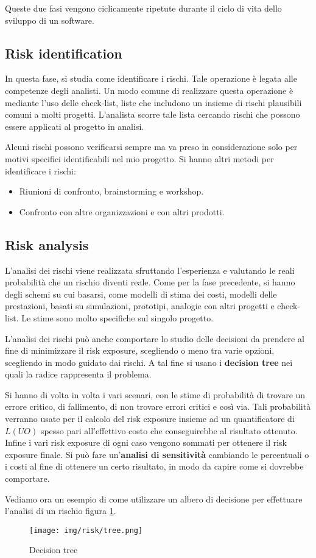 Queste due fasi vengono ciclicamente ripetute durante il ciclo di vita dello sviluppo di un software.
\subsection{Risk identification}
In questa fase, si studia come identificare i rischi. Tale operazione è legata alle competenze degli analisti. Un modo comune di realizzare questa operazione è mediante l'uso delle check-list, liste che includono un insieme di rischi plausibili comuni a molti progetti. L'analista scorre tale lista cercando rischi che possono essere applicati al progetto in analisi.

Alcuni rischi possono verificarsi sempre ma va preso in considerazione solo per motivi specifici identificabili nel mio progetto. Si hanno altri metodi per identificare i rischi:
\begin{itemize}
    \item Riunioni di confronto, brainstorming e workshop.
    \item Confronto con altre organizzazioni e con altri prodotti.
\end{itemize}
\subsection{Risk analysis}
L'analisi dei rischi viene realizzata sfruttando l'esperienza e valutando le reali probabilità che un rischio diventi reale. Come per la fase precedente, si hanno degli schemi su cui basarsi, come modelli di stima dei costi, modelli delle prestazioni, basati su simulazioni, prototipi, analogie con altri progetti e check-list. Le stime sono molto specifiche sul singolo progetto.

L'analisi dei rischi può anche comportare lo studio delle decisioni da prendere al fine di minimizzare il risk exposure, scegliendo o meno tra varie opzioni, scegliendo in modo guidato dai rischi. A tal fine si usano i \textbf{decision tree} nei quali la radice rappresenta il problema.

Si hanno di volta in volta i vari scenari, con le stime di probabilità di trovare un errore critico, di fallimento, di non trovare errori critici e così via. Tali probabilità verranno usate per il calcolo del risk exposure insieme ad un quantificatore di $L(UO)$ spesso pari all'effettivo costo che conseguirebbe al risultato ottenuto. Infine i vari risk exposure di ogni caso vengono sommati per ottenere il risk exposure finale. Si può fare un'\textbf{analisi di sensitività} cambiando le percentuali o i costi al fine di ottenere un certo risultato, in modo da capire come si dovrebbe comportare.
\begin{esempio}
    Vediamo ora un esempio di come utilizzare un albero di decisione per effettuare l'analisi di un rischio figura \ref{fig:tree}.
    \begin{figure}[!ht]
        \centering
        \texttt{[image: img/risk/tree.png]}
        \caption{Decision tree}
        \label{fig:tree}
    \end{figure}
\end{esempio}

